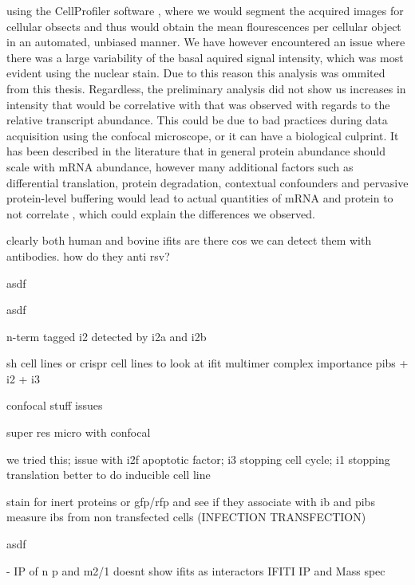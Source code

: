 using the CellProfiler software \cite{McQuin2018CellProfilerBiology}, where we would segment the acquired images for cellular obsects and thus would obtain the mean flourescences per cellular object in an automated, unbiased manner. We have however encountered an issue where there was a large variability of the basal aquired signal intensity, which was most evident using the nuclear stain. Due to this reason this analysis was ommited from this thesis. Regardless, the preliminary analysis did not show us increases in intensity that would be correlative with that was observed with regards to the relative transcript abundance. This could be due to bad practices during data acquisition using the confocal microscope, or it can have a biological culprint. It has been described in the literature that in general protein abundance should scale with mRNA abundance, however many additional factors such as differential translation, protein degradation, contextual confounders and pervasive protein-level buffering would lead to actual quantities of mRNA and protein to not correlate \cite{Liu2016OnAbundance, Buccitelli2020MRNAsControl}, which could explain the differences we observed.

clearly both human and bovine ifits are there cos we can detect them with antibodies. how do they anti rsv?

asdf

asdf

n-term tagged i2 detected by i2a and i2b

sh cell lines or crispr cell lines to look at ifit multimer complex importance
pibs + i2 + i3

confocal stuff issues

super res micro with confocal

we tried this; issue with i2f apoptotic factor; i3 stopping cell cycle; i1 stopping translation
better to do inducible cell line

stain for inert proteins or gfp/rfp and see if they associate with ib and pibs
measure ibs from non transfected cells (INFECTION TRANSFECTION)

asdf

\cite{Oliveira2013HumanCells} - IP of n p and m2/1 doesnt show ifits as interactors
IFITI IP and Mass spec

